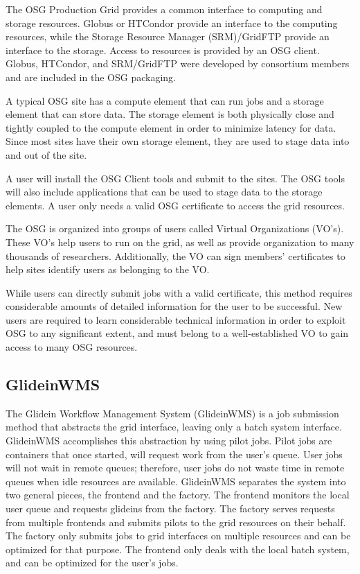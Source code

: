 The OSG Production Grid provides a common interface to computing and storage resources. Globus or HTCondor provide an interface to the computing resources, while the Storage Resource Manager (SRM)/GridFTP provide an interface to the storage.  Access to resources is provided by an OSG client.  Globus, HTCondor, and SRM/GridFTP were developed by consortium members and are included in the OSG packaging.

A typical OSG site has a compute element that can run jobs and a storage element that can store data.  The storage element is both physically close and tightly coupled to the compute element in order to minimize latency for data.  Since most sites have their own storage element, they are used to stage data into and out of the site.

A user will install the OSG Client tools and submit to the sites.  The OSG tools will also include applications that can be used to stage data to the storage elements.  A user only needs a valid OSG certificate to access the grid resources.  

The OSG is organized into groups of users called Virtual Organizations (VO's).  These VO's help users to run on the grid, as well as provide organization to many thousands of researchers.  Additionally, the VO can sign members' certificates to help sites identify users as belonging to the VO.

While users can directly submit jobs with a valid certificate, this method requires considerable amounts of detailed information for the user to be successful.  New users are required to learn considerable technical information in order to exploit OSG to any significant extent, and must belong to a well-established VO to gain access to many OSG resources.

\subsection{GlideinWMS}
The Glidein Workflow Management System (GlideinWMS) \cite{sfiligoi2008glideinwms} is a job submission method that abstracts the grid interface, leaving only a batch system interface.  GlideinWMS accomplishes this abstraction by using pilot jobs.  Pilot jobs are containers that once started, will request work from the user's queue.  User jobs will not wait in remote queues; therefore, user jobs do not waste time in remote queues when idle resources are available.  GlideinWMS separates the system into two general pieces, the frontend and the factory.  The frontend monitors the local user queue and requests glideins from the factory.  The factory serves requests from multiple frontends and submits pilots to the grid resources on their behalf.  The factory only submits jobs to grid interfaces on multiple resources and can be optimized for that purpose.  The frontend only deals with the local batch system, and can be optimized for the user's jobs.
 
